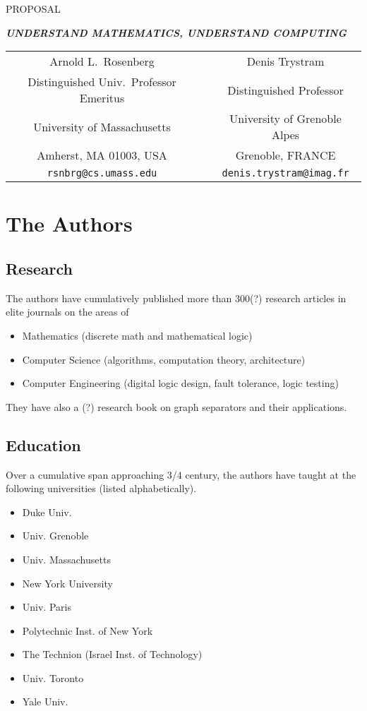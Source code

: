 \documentclass{article}[12pt]
\begin{document}
\begin{center}
PROPOSAL 

{\Large\bf\em UNDERSTAND MATHEMATICS, UNDERSTAND COMPUTING}
\end{center}

\begin{center}
\begin{tabular}{ccc}
{\large Arnold L.~Rosenberg} & & {\large Denis Trystram} \\
Distinguished Univ.~Professor Emeritus
  & & Distinguished Professor \\
University of Massachusetts  & & University of Grenoble Alpes \\
Amherst, MA 01003, USA       & & Grenoble, FRANCE \\
{\small\tt rsnbrg@cs.umass.edu} & & {\small\tt denis.trystram@imag.fr}
\end{tabular}
\end{center}

\section*{The Authors}

\subsection*{Research}

The authors have cumulatively published more than 300(?) research articles in elite journals on the areas of
\begin{itemize}
\item
Mathematics (discrete math and mathematical logic)
\item
Computer Science (algorithms, computation theory, architecture)
\item
Computer Engineering (digital logic design, fault tolerance, logic testing)
\end{itemize}
They have also a (?) research book on graph separators and their applications.

\subsection*{Education}

Over a cumulative span approaching 3/4 century, the authors have taught at the following universities (listed alphabetically).
\begin{itemize}
\item
Duke Univ.
\item
Univ. Grenoble
\item
Univ. Massachusetts
\item
New York University
\item
Univ. Paris
\item
Polytechnic Inst. of New York
\item
The Technion (Israel Inst. of Technology)
\item
Univ. Toronto
\item
Yale Univ.
\end{itemize}
\end{document}
